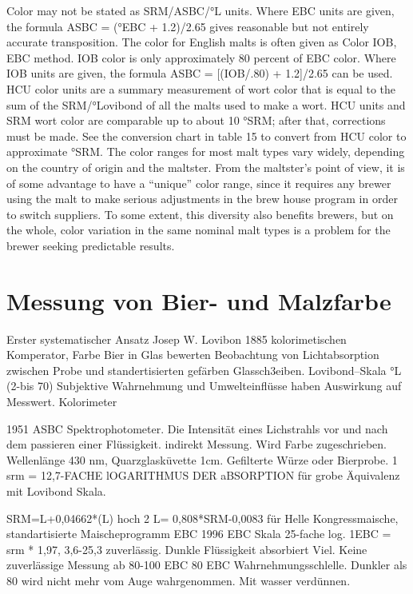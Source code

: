 \documentclass[a4paper,parskip=half]{scrartcl}
\begin{document}
\parencite[11]{Noonan1996}
Color may not be stated as SRM/ASBC/°L units.
Where EBC units are given, the formula ASBC = (°EBC
+ 1.2)/2.65 gives reasonable but not entirely accurate
transposition. The color for English malts is often given as
Color IOB, EBC method. IOB color is only approximately
80 percent of EBC color. Where IOB units are given, the
formula ASBC = [(IOB/.80) + 1.2]/2.65 can be used.
HCU color units are a summary measurement of
wort color that is equal to the sum of the SRM/°Lovibond
of all the malts used to make a wort. HCU units and SRM
wort color are comparable up to about 10 °SRM; after that,
corrections must be made. See the conversion chart in
table 15 to convert from HCU color to approximate °SRM.
The color ranges for most malt types vary widely,
depending on the country of origin and the maltster. From
the maltster’s point of view, it is of some advantage to
have a “unique” color range, since it requires any brewer
using the malt to make serious adjustments in the brew
house program in order to switch suppliers. To some
extent, this diversity also benefits brewers, but on the
whole, color variation in the same nominal malt types is a
problem for the brewer seeking predictable results.

\section*{Messung von Bier- und Malzfarbe}

\parencite{KrausWeyermann2021a}
Erster systematischer Ansatz
Josep W. Lovibon 1885 kolorimetischen Komperator, Farbe Bier in Glas bewerten
Beobachtung von Lichtabsorption zwischen Probe und standertisierten
gefärben Glassch3eiben. Lovibond--Skala °L (2-bis 70)
Subjektive Wahrnehmung und Umwelteinflüsse haben Auswirkung auf Messwert.
Kolorimeter

\parencite{KrausWeyermann2021a}
1951 ASBC Spektrophotometer. Die Intensität eines Lichstrahls vor und nach
dem passieren einer Flüssigkeit. indirekt Messung. Wird Farbe zugeschrieben.
Wellenlänge 430 nm, Quarzglasküvette 1cm. Gefilterte Würze oder Bierprobe.
1 srm = 12,7-FACHE lOGARITHMUS DER aBSORPTION für grobe Äquivalenz mit Lovibond
Skala.

\parencite{KrausWeyermann2021a}
SRM=L+0,04662*(L) hoch 2
L= 0,808*SRM-0,0083 für Helle
Kongressmaische, standartisierte Maischeprogramm
EBC 1996 EBC Skala 25-fache log. 1EBC = srm * 1,97,
3,6-25,3 zuverlässig. 
Dunkle Flüssigkeit absorbiert Viel. Keine zuverlässige Messung ab 80-100 EBC
80 EBC Wahrnehmungsschlelle. Dunkler als 80 wird nicht mehr vom Auge wahrgenommen.
Mit wasser verdünnen. 
\end{document}
